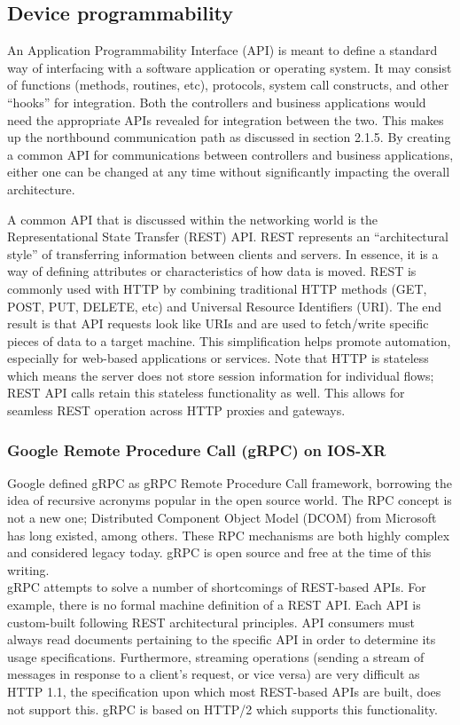 \subsection{Device programmability}
An Application Programmability Interface (API) is meant to define a standard
way of interfacing with a software application or operating system. It may
consist of functions (methods, routines, etc), protocols, system call
constructs, and other ``hooks'' for integration. Both the controllers and
business applications would need the appropriate APIs revealed for integration
between the two. This makes up the northbound communication path as discussed
in section 2.1.5. By creating a common API for communications between
controllers and business applications, either one can be changed at any time
without significantly impacting the overall architecture.

A common API that is discussed within the networking world is the
Representational State Transfer (REST) API\@. REST represents an ``architectural
style'' of transferring information between clients and servers. In essence, it
is a way of defining attributes or characteristics of how data is moved. REST
is commonly used with HTTP by combining traditional HTTP methods (GET, POST,
PUT, DELETE, etc) and Universal Resource Identifiers (URI). The end result is
that API requests look like URIs and are used to fetch/write specific pieces
of data to a target machine. This simplification helps promote automation,
especially for web-based applications or services. Note that HTTP is stateless
which means the server does not store session information for individual
flows; REST API calls retain this stateless functionality as well. This allows
for seamless REST operation across HTTP proxies and gateways.

\subsubsection{Google Remote Procedure Call (gRPC) on IOS-XR}
Google defined gRPC as gRPC Remote Procedure Call framework, borrowing the
idea of recursive acronyms popular in the open source world. The RPC concept
is not a new one; Distributed Component Object Model (DCOM) from Microsoft has
long existed, among others. These RPC mechanisms are both highly complex and
considered legacy today. gRPC is open source and free at the time of this
writing. \\

gRPC attempts to solve a number of shortcomings of REST-based APIs. For
example, there is no formal machine definition of a REST API\@. Each API is
custom-built following REST architectural principles. API consumers must
always read documents pertaining to the specific API in order to determine its
usage specifications. Furthermore, streaming operations (sending a stream of
messages in response to a client's request, or vice versa) are very difficult
as HTTP 1.1, the specification upon which most REST-based APIs are built, does
not support this. gRPC is based on HTTP/2 which supports this functionality. \\

